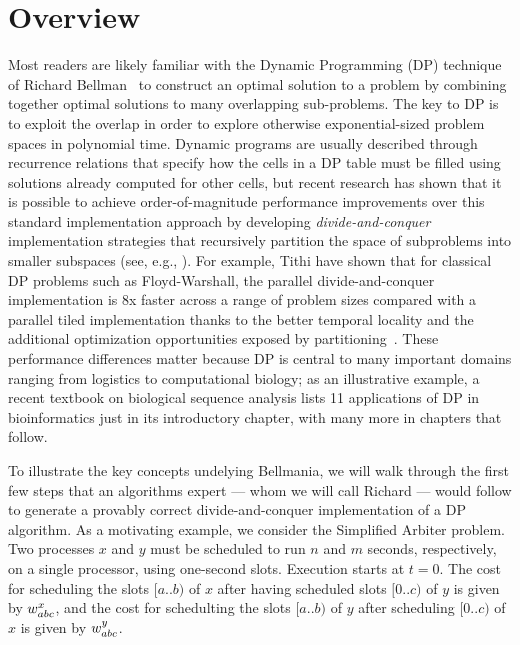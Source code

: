 \section{Overview}
\label{overview}

Most readers are likely familiar with the Dynamic Programming (DP) technique of Richard Bellman~\cite{03/Bellman:DP} to construct an optimal solution to a problem by combining together optimal solutions to many overlapping sub-problems. The key to DP is to exploit the overlap in order to explore otherwise exponential-sized problem spaces in polynomial time. Dynamic programs are usually described through recurrence relations that specify how the cells in a DP table must be filled using solutions already computed for other cells, but recent research has shown that it is possible to achieve order-of-magnitude performance improvements over this standard implementation approach by developing \emph{divide-and-conquer}  implementation strategies that recursively
partition the space of subproblems into smaller subspaces (see, e.g., \cite{IPDPS15/Tithi}).   For example, Tithi \etal{} have shown that for classical DP problems such as Floyd-Warshall, the parallel divide-and-conquer implementation is  8x faster  across a range of problem sizes compared with a parallel tiled implementation thanks to the better temporal locality and the additional optimization opportunities exposed by partitioning~\cite{IPDPS15/Tithi}. These performance differences matter because  DP is central to many important domains ranging from logistics to computational biology; as an illustrative example, a recent textbook \cite{DurbinEdKr98} on biological sequence analysis lists 11 applications of DP in bioinformatics just in its introductory chapter, with many more in chapters that follow.



To illustrate the key concepts undelying Bellmania, we will walk through the first
few steps that an algorithms expert --- whom we will call Richard --- would follow to
generate a provably correct divide-and-conquer implementation of a DP algorithm.
As a motivating example, we consider the Simplified Arbiter problem.
Two processes $x$ and $y$ must be scheduled to run $n$ and $m$ seconds,
respectively, on a single processor, using one-second slots.
Execution starts at $t=0$. The cost for scheduling the slots $[a..b)$ of $x$ after
having scheduled slots $[0..c)$ of $y$
is given by $w^x_{abc}$, and the cost for schedulting the slots $[a..b)$ of $y$
after scheduling $[0..c)$ of $x$ is given by $w^y_{abc}$.

